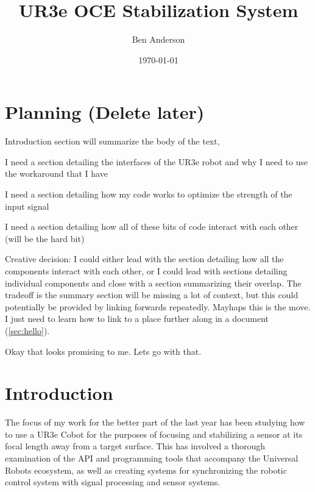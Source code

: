 \documentclass[11pt]{article}
\date{\today}
\title{}
\begin{document}

\author{Ben Anderson}
\title{UR3e OCE Stabilization System}
\maketitle
\tableofcontents
\parskip=6pt

\section{Planning (Delete later)}
Introduction section will summarize the body of the text,

I need a section detailing the interfaces of the UR3e robot and why I need to use the workaround that I have

I need a section detailing how my code works to optimize the strength of the input signal

I need a section detailing how all of these bits of code interact with each other (will be the hard bit)

Creative decision: I could either lead with the section detailing how all the components interact with each other, or I could lead with sections detailing individual components and close with a section summarizing their overlap. The tradeoff is the summary section will be missing a lot of context, but this could potentially be provided by linking forwards repeatedly. Mayhaps this is the move. I just need to learn how to link to a place further along in a document (\autoref{sec:hello}).

Okay that looks promising to me. Lets go with that.

\section{Introduction}\label{sec:hello}

The focus of my work for the better part of the last year has been studying how to use a UR3e Cobot for the purposes of focusing and stabilizing a sensor at its focal length away from a target surface. This has involved a thorough examination of the API and programming tools that accompany the Universal Robots ecosystem, as well as creating systems for synchronizing the robotic control system with signal processing and sensor systems.
\end{document}
